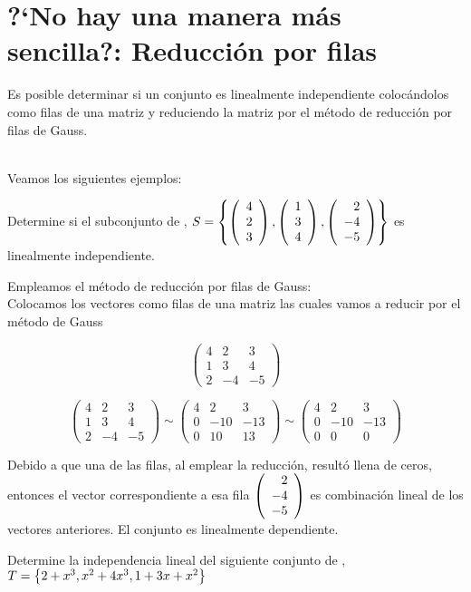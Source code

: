 \section{?`No hay una manera m\'as sencilla?: Reducci\'on por filas}
Es posible determinar si un conjunto es linealmente independiente coloc\'andolos como filas de una matriz y reduciendo la matriz por el m\'etodo de reducci\'on por filas de Gauss.

~\\
Veamos los siguientes ejemplos:
~\\

\begin{ejemplo}
Determine si el subconjunto de \rtres, $S= \left\{\left( \begin{array}{r} 4\\ 2\\ 3 \end{array} \right) ,\left( \begin{array}{r} 1\\ 3\\ 4 \end{array} \right) , \left( \begin{array}{r} 2\\ -4\\ -5 \end{array} \right)  \right\} $ es linealmente independiente.
\end{ejemplo}



Empleamos el m\'etodo de reducci\'on por filas de Gauss:
~\\
Colocamos los vectores como filas de una matriz las cuales vamos a reducir por el m\'etodo de Gauss

\[\left(
\begin{array}{rrr}
4&2&3\\
1&3&4\\
2&-4&-5
\end{array}
\right)\]

\[
\left(
\begin{array}{rrr}
4&2&3\\
1&3&4\\
2&-4&-5
\end{array}
\right)
\sim
\left(
\begin{array}{rrr}
4&2&3\\
0&-10&-13\\
0&10&13
\end{array}
\right)
\sim
\left(
\begin{array}{rrr}
4&2&3\\
0&-10&-13\\
0&0&0
\end{array}
\right)
\]

Debido a que una de las filas, al emplear la reducci\'on, resultó llena de ceros, entonces el vector correspondiente a esa fila $\left( \begin{array}{r} 2\\ -4\\ -5 \end{array} \right) $ es combinaci\'on lineal de los vectores anteriores.
El conjunto es linealmente dependiente.


\begin{ejemplo}
Determine la independencia lineal del siguiente conjunto de \ptres, 
$T= \left\{2+x^3, x^2+4x^3, 1+3x+x^2 \right\} $
\end{ejemplo}

